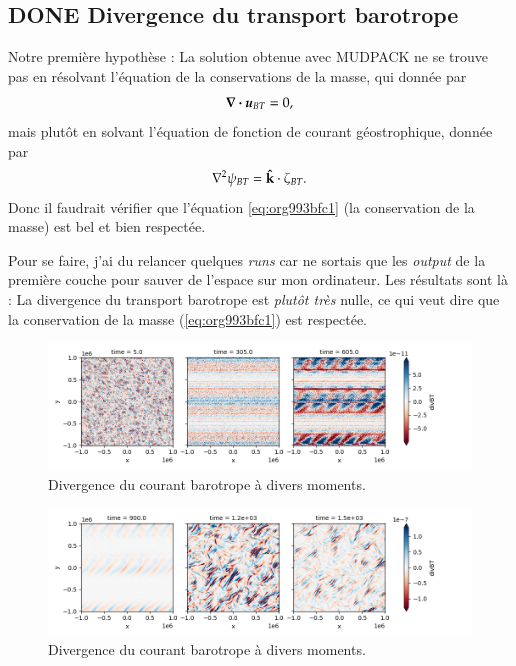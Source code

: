 \documentclass[10pt]{article}
\numberwithin{equation}{section}
\newcommand{\kvf}{\vb{\hat{k}}}
\newcommand{\uu}{\vb*{u}}
\begin{document}
\subsection{{\bfseries\sffamily DONE} Divergence du transport barotrope}
\label{sec:orgda1c814}
Notre première hypothèse : La solution obtenue avec MUDPACK ne se trouve pas en résolvant l'équation de la conservations de la masse, qui donnée par
\begin{equation}
\label{eq:org993bfc1}
   \div{\uu_{BT}} = 0,
\end{equation}
mais plutôt en solvant l'équation de fonction de courant géostrophique, donnée par
\begin{equation}
   \laplacian{\psi_{BT}} = \kvf \cdot \zeta_{BT}.
\end{equation}
Donc il faudrait vérifier que l'équation \ref{eq:org993bfc1} (la conservation de la masse) est bel et bien respectée.\bigskip

Pour se faire, j'ai du relancer quelques \emph{runs} car ne sortais que les \emph{output} de la première couche pour sauver de l'espace sur mon ordinateur.
Les résultats sont là :
La divergence du transport barotrope est \emph{plutôt très} nulle, ce qui veut dire que la conservation de la masse (\ref{eq:org993bfc1}) est respectée.

\begin{figure}[htbp]
\centering
\includegraphics[width=.9\linewidth]{figures/debuggage/2023_06_21divBT1.png}
\caption{\label{fig:orgaf83ab7}Divergence du courant barotrope à divers moments.}
\end{figure}
\begin{figure}[htbp]
\centering
\includegraphics[width=.9\linewidth]{figures/debuggage/2023_06_21divBT2.png}
\caption{\label{fig:orgaf83ab7}Divergence du courant barotrope à divers moments.}
\end{figure}
\end{document}
